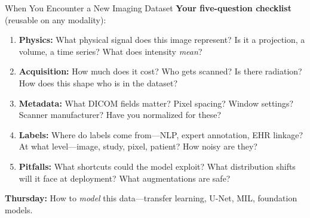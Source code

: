 \documentclass[aspectratio=169,10pt]{beamer}
\begin{document}
\begin{frame}{When You Encounter a New Imaging Dataset}
\textbf{Your five-question checklist} (reusable on any modality):

\vspace{0.3em}
\begin{enumerate}
    \item \textbf{Physics:} What physical signal does this image represent? Is it a projection, a volume, a time series? What does intensity \emph{mean}?
    \pause
    \item \textbf{Acquisition:} How much does it cost? Who gets scanned? Is there radiation? How does this shape who is in the dataset?
    \pause
    \item \textbf{Metadata:} What DICOM fields matter? Pixel spacing? Window settings? Scanner manufacturer? Have you normalized for these?
    \pause
    \item \textbf{Labels:} Where do labels come from---NLP, expert annotation, EHR linkage? At what level---image, study, pixel, patient? How noisy are they?
    \pause
    \item \textbf{Pitfalls:} What shortcuts could the model exploit? What distribution shifts will it face at deployment? What augmentations are safe?
\end{enumerate}

\vspace{0.2em}
\textbf{Thursday:} How to \emph{model} this data---transfer learning, U-Net, \alert{MIL}, foundation models.
\end{frame}
\end{document}
